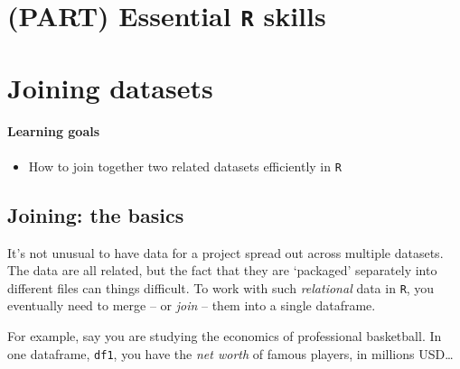 \documentclass[
]{book}
\providecommand{\tightlist}{%
  \setlength{\itemsep}{0pt}\setlength{\parskip}{0pt}}
\begin{document}
\hypertarget{part-essential-r-skills}{%
\chapter*{\texorpdfstring{(PART) Essential \texttt{R} skills}{(PART) Essential R skills}}\label{part-essential-r-skills}}

\hypertarget{joining_datasets}{%
\chapter{Joining datasets}\label{joining_datasets}}

\hypertarget{learning-goals-13}{%
\subsubsection*{Learning goals}\label{learning-goals-13}}

\begin{itemize}
\tightlist
\item
  How to join together two related datasets efficiently in \texttt{R}
\end{itemize}

\hypertarget{joining-the-basics}{%
\section*{Joining: the basics}\label{joining-the-basics}}

It's not unusual to have data for a project spread out across multiple datasets. The data are all related, but the fact that they are `packaged' separately into different files can things difficult. To work with such \emph{relational} data in \texttt{R}, you eventually need to merge -- or \emph{join} -- them into a single dataframe.

For example, say you are studying the economics of professional basketball. In one dataframe, \texttt{df1}, you have the \emph{net worth} of famous players, in millions USD\ldots{}
\end{document}
